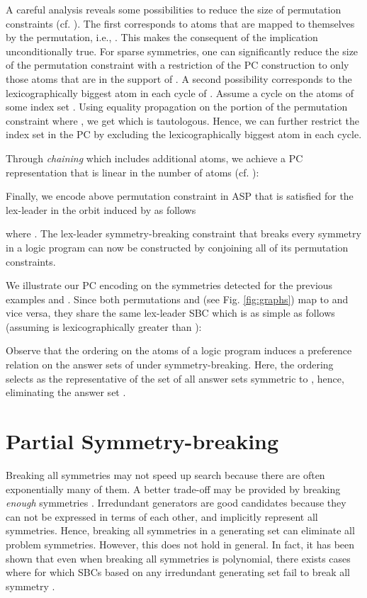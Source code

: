 \documentclass[envcountsame]{llncs}
\begin{document}
A careful analysis reveals some possibilities to reduce the size of permutation constraints (cf. \cite{sa09a}). The first corresponds to atoms that are mapped to themselves by the permutation, i.e., . This makes the consequent of the implication unconditionally true. For sparse symmetries, one can significantly reduce the size of the permutation constraint with a restriction of the PC construction to only those atoms that are in the support of . A second possibility corresponds to the lexicographically biggest atom in each cycle of . Assume a cycle  on the atoms of some index set . Using equality propagation on the portion of the permutation constraint where , we get  which is tautologous. Hence, we can further restrict the index set in the PC by excluding the lexicographically biggest atom in each cycle.

Through \emph{chaining} which includes additional atoms, we achieve a PC representation that is linear in the number of atoms (cf. \cite{almasa03a}):

Finally, we encode above permutation constraint in ASP that is satisfied for the lex-leader in the orbit induced by  as follows

where . The lex-leader symmetry-breaking constraint that breaks every symmetry in a logic program can now be constructed by conjoining all of its permutation constraints. 
\begin{example}
We illustrate our PC encoding on the symmetries detected for the previous examples  and . Since both permutations  and  (see Fig. \ref{fig:graphs}) map  to  and vice versa, they share the same lex-leader SBC which is as simple as follows (assuming  is lexicographically greater than ):

Observe that the ordering on the atoms of a logic program  induces a preference relation on the answer sets of  under symmetry-breaking. Here, the ordering selects  as the representative of the set of all answer sets symmetric to , hence, eliminating the answer set . 
\end{example}


\section{Partial Symmetry-breaking \label{sec:psb}}
Breaking all symmetries may not speed up search because there are often exponentially many of them. A better trade-off may be provided by breaking \emph{enough} symmetries \cite{crgiluro96a}. Irredundant generators are good candidates because they can not be expressed in terms of each other, and implicitly represent all symmetries.
Hence, breaking all symmetries in a generating set can eliminate all problem symmetries. However, this does not hold in general. In fact, it has been shown that even when breaking all symmetries is polynomial, there exists cases where for which SBCs based on any irredundant generating set fail to break all symmetry \cite{kanawa09a}.
\end{document}
